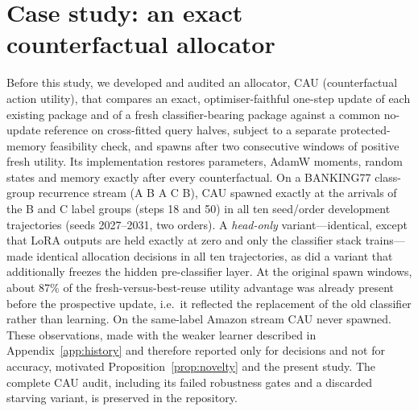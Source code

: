 \documentclass[10pt]{article}
\begin{document}
\section{Case study: an exact counterfactual allocator}
\label{app:cau}
Before this study, we developed and audited an allocator, CAU (counterfactual action utility), that compares an exact, optimiser-faithful one-step update of each existing package and of a fresh classifier-bearing package against a common no-update reference on cross-fitted query halves, subject to a separate protected-memory feasibility check, and spawns after two consecutive windows of positive fresh utility. Its implementation restores parameters, AdamW moments, random states and memory exactly after every counterfactual. On a BANKING77 class-group recurrence stream (A B A C B), CAU spawned exactly at the arrivals of the B and C label groups (steps 18 and 50) in all ten seed/order development trajectories (seeds 2027--2031, two orders). A \emph{head-only} variant---identical, except that LoRA outputs are held exactly at zero and only the classifier stack trains---made identical allocation decisions in all ten trajectories, as did a variant that additionally freezes the hidden pre-classifier layer. At the original spawn windows, about 87\% of the fresh-versus-best-reuse utility advantage was already present before the prospective update, i.e.\ it reflected the replacement of the old classifier rather than learning. On the same-label Amazon stream CAU never spawned. These observations, made with the weaker learner described in Appendix~\ref{app:history} and therefore reported only for decisions and not for accuracy, motivated Proposition~\ref{prop:novelty} and the present study. The complete CAU audit, including its failed robustness gates and a discarded starving variant, is preserved in the repository.
\end{document}
